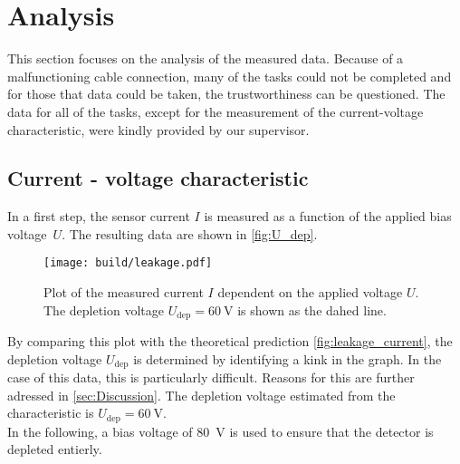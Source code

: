 \section{Analysis}
\label{sec:Analysis}
This section focuses on the analysis of the measured data. Because of a malfunctioning cable connection, many of the tasks could not be completed and for those
that data could be taken, the trustworthiness can be questioned. The data for all of the tasks, except for the measurement of the current-voltage characteristic,
were kindly provided by our supervisor.

\subsection{Current - voltage characteristic}
\label{sec:current-voltage characteristic}
In a first step, the sensor current $I$ is measured as a function of the applied bias voltage~$U$. The resulting data are shown in \autoref{fig:U_dep}.
\begin{figure}
    \centering
    \texttt{[image: build/leakage.pdf]}
    \caption{Plot of the measured current $I$ dependent on the applied voltage $U$. The depletion voltage $U_{\mathrm{dep}} = \qty{60}{\volt}$ is shown as
    the dahed line.}
    \label{fig:U_dep}
\end{figure}
By comparing this plot with the theoretical prediction \autoref{fig:leakage_current}, the depletion voltage $U_{\mathrm{dep}}$ is determined by identifying a kink
in the graph. In the case of this data, this is particularly difficult. Reasons for this are further adressed in \autoref{sec:Discussion}. The depletion voltage
estimated from the characteristic is $U_\mathrm{dep} = \qty{60}{\volt}$.\\
In the following, a bias voltage of \qty{80}{\volt} is used to ensure that the detector is depleted entierly.

